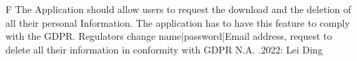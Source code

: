 \begin{myreq}
    \threeinline
    {\reqno}
    {\reqtype F}
    {}
    \reqdesc The Application should allow users to request the download and the deletion of all their personal Information.
    \reqrat The application has to have this feature to comply with the GDPR.
    \reqorig Regulators
    \reqfit change name|password|Email address, request to delete all their information in conformity with GDPR
    \twoinline
    {}
    {}
    \twoinline
    {}
    {\reqconf N.A.}
    \reqmater  {}
    .2022: Lei Ding


\end{myreq}